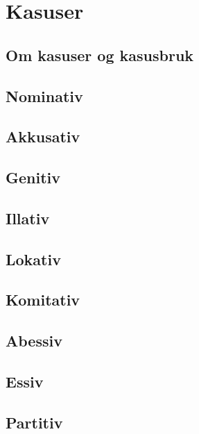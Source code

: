 \chapter{Kasuser}

\section{Om kasuser og kasusbruk}

\section{Nominativ}

\section{Akkusativ}

\section{Genitiv}

\section{Illativ}

\section{Lokativ}

\section{Komitativ}

\section{Abessiv}

\section{Essiv}

\section{Partitiv}